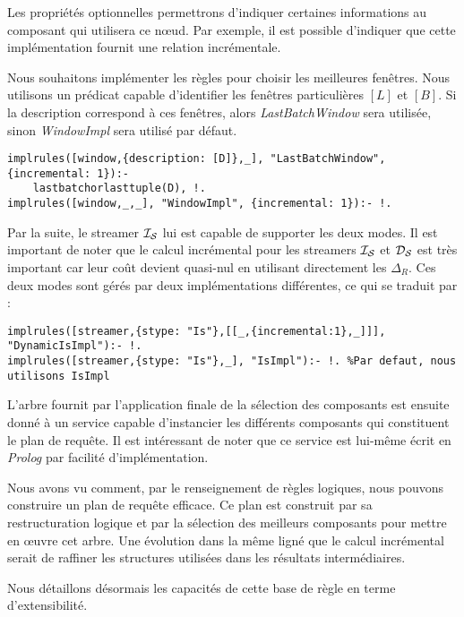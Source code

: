 Les propriétés optionnelles permettrons d'indiquer certaines informations au composant qui utilisera ce nœud. Par exemple, il est possible d'indiquer que cette implémentation fournit une relation incrémentale.
\begin{example}
	Nous souhaitons implémenter les règles pour choisir les meilleures fenêtres. Nous utilisons un prédicat capable d'identifier les fenêtres particulières $[L]$ et $[B]$. Si la description correspond à ces fenêtres, alors \textit{LastBatchWindow} sera utilisée, sinon \textit{WindowImpl} sera utilisé par défaut.
\begin{lstlisting}
implrules([window,{description: [D]},_], "LastBatchWindow", {incremental: 1}):-
    lastbatchorlasttuple(D), !.
implrules([window,_,_], "WindowImpl", {incremental: 1}):- !.
\end{lstlisting}
\end{example}

\begin{example}
Par la suite, le streamer $\mathcal{I_S}$ lui est capable de supporter les deux modes. Il est important de noter que le calcul incrémental pour les streamers $\mathcal{I_S}$ et $\mathcal{D_S}$ est très important car leur coût devient quasi-nul en utilisant directement les $\Delta_R$. Ces deux modes sont gérés par deux implémentations différentes, ce qui se traduit par :
\begin{lstlisting}
implrules([streamer,{stype: "Is"},[[_,{incremental:1},_]]], "DynamicIsImpl"):- !.
implrules([streamer,{stype: "Is"},_], "IsImpl"):- !. %Par defaut, nous utilisons IsImpl
\end{lstlisting}
\end{example}

L'arbre fournit par l'application finale de la sélection des composants est ensuite donné à un service capable d'instancier les différents composants qui constituent le plan de requête. Il est intéressant de noter que ce service est lui-même écrit en \textit{Prolog} par facilité d'implémentation.

Nous avons vu comment, par le renseignement de règles logiques, nous pouvons construire un plan de requête efficace. Ce plan est construit par sa restructuration logique et par la sélection des meilleurs composants pour mettre en œuvre cet arbre. Une évolution dans la même ligné que le calcul incrémental serait de raffiner les structures utilisées dans les résultats intermédiaires.

Nous détaillons désormais les capacités de cette base de règle en terme d'extensibilité.